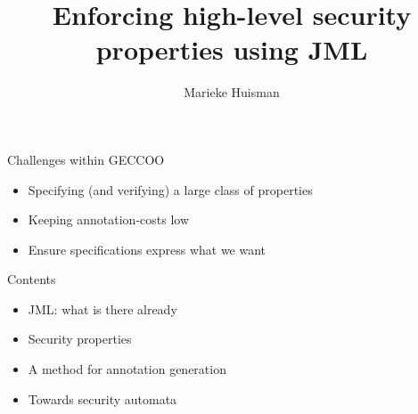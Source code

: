 \documentclass[final,nocolorBG,a4,marieke,nototal,pdf, accumulate,slideColor]{prosper}
\title{Enforcing high-level security properties using JML}
\subtitle{}
\author{Marieke Huisman}
\newcommand{\textttbf}[1]{\texttt{\textbf{#1}}}
\begin{document}
 

\maketitle

\begin{slide}{Challenges within GECCOO}
\begin{itemize}
\item Specifying (and verifying) a large class of properties
\item Keeping annotation-costs low
\item Ensure specifications express what we want
\end{itemize}
\end{slide}

\begin{slide}{Contents}
\begin{itemize}
\item JML: what is there already
\item Security properties
\item A method for annotation generation
\item Towards security automata
\end{itemize}
\end{slide}

\end{document}
